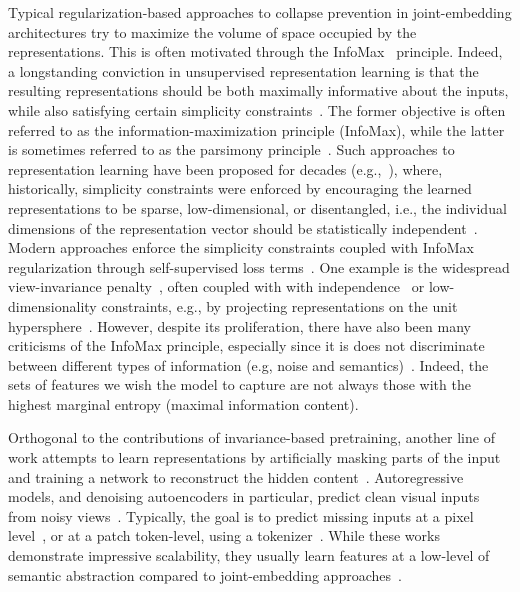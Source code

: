 \documentclass[10pt,twocolumn,letterpaper]{article}
\begin{document}
Typical regularization-based approaches to collapse prevention in joint-embedding architectures try to maximize the volume of space occupied by the representations.
This is often motivated through the InfoMax~\cite{ma2022principles} principle.
Indeed, a longstanding conviction in unsupervised representation learning is that the resulting representations should be both maximally informative about the inputs, while also satisfying certain simplicity constraints~\cite{linsker1988self, goodfellow2016deep}.
The former objective is often referred to as the information-maximization principle (InfoMax), while the latter is sometimes referred to as the parsimony principle~\cite{ma2022principles}.
Such approaches to representation learning have been proposed for decades (e.g.,~\cite{bridle1991unsupervised}), where, historically, simplicity constraints were enforced by encouraging the learned representations to be sparse, low-dimensional, or disentangled, i.e., the individual dimensions of the representation vector should be statistically independent~\cite{goodfellow2016deep}.
Modern approaches enforce the simplicity constraints coupled with InfoMax regularization through self-supervised loss terms~\cite{hjelm2018learning, tschannen2019mutual, bachman2019learning, krause2010discriminative, hu2017learning, oord2018representation}.
One example is the widespread view-invariance penalty~\cite{misra2020self}, often coupled with with independence~\cite{zbontar2021barlow, bardes2021vicreg} or low-dimensionality constraints, e.g., by projecting representations on the unit hypersphere~\cite{chen2020simple,he2019moco,grill2020bootstrap}.
However, despite its proliferation, there have also been many criticisms of the InfoMax principle, especially since it is does not discriminate between different types of information (e.g, noise and semantics)~\cite{assran2022hidden}.
Indeed, the sets of features we wish the model to capture are not always those with the highest marginal entropy (maximal information content).

Orthogonal to the contributions of invariance-based pretraining, another line of work attempts to learn representations by artificially masking parts of the input and training a network to reconstruct the hidden content~\cite{vincent2010stacked}.
Autoregressive models, and denoising autoencoders in particular, predict clean visual inputs from noisy views~\cite{chen2020generative,vincent2010stacked,he2021masked,bao2021beit,baevski2022data2vec}.
Typically, the goal is to predict missing inputs at a pixel level~\cite{dosovitskiy2020image,he2021masked,xie2019unsupervised}, or at a patch token-level, using a tokenizer~\cite{bao2021beit,wei2021masked}.
While these works demonstrate impressive scalability, they usually learn features at a low-level of semantic abstraction compared to joint-embedding approaches~\cite{assran2022masked}.
\end{document}
